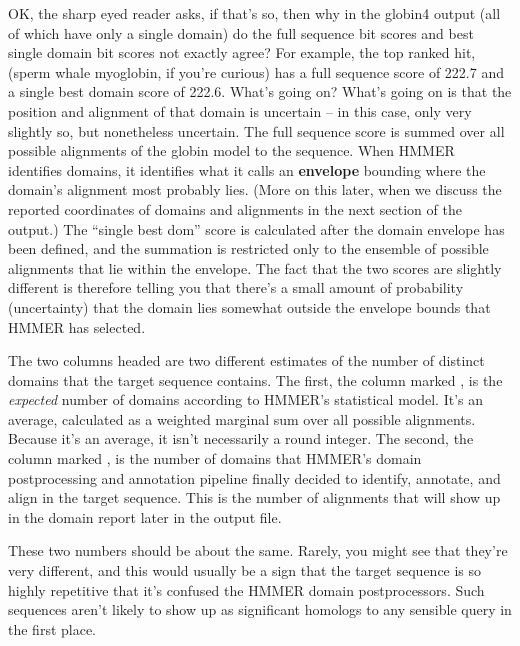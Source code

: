 OK, the sharp eyed reader asks, if that's so, then why in the globin4
output (all of which have only a single domain) do the full sequence
bit scores and best single domain bit scores not exactly agree? For
example, the top ranked hit,  (sperm whale myoglobin,
if you're curious) has a full sequence score of 222.7 and a single
best domain score of 222.6. What's going on? What's going on is that
the position and alignment of that domain is uncertain -- in this
case, only very slightly so, but nonetheless uncertain. The full
sequence score is summed over all possible alignments of the globin
model to the  sequence. When HMMER identifies
domains, it identifies what it calls an \textbf{envelope} bounding
where the domain's alignment most probably lies. (More on this later,
when we discuss the reported coordinates of domains and alignments in
the next section of the output.) The ``single best dom'' score is
calculated after the domain envelope has been defined, and the
summation is restricted only to the ensemble of possible alignments
that lie within the envelope. The fact that the two scores are
slightly different is therefore telling you that there's a small
amount of probability (uncertainty) that the domain lies somewhat
outside the envelope bounds that HMMER has selected.

The two columns headed  are two different estimates of
the number of distinct domains that the target sequence contains. The
first, the column marked , is the \emph{expected} number of
domains according to HMMER's statistical model. It's an average,
calculated as a weighted marginal sum over all possible
alignments. Because it's an average, it isn't necessarily a round
integer. The second, the column marked , is the number of
domains that HMMER's domain postprocessing and annotation pipeline
finally decided to identify, annotate, and align in the target
sequence. This is the number of alignments that will show up in the
domain report later in the output file.

These two numbers should be about the same. Rarely, you might see that
they're very different, and this would usually be a sign that the
target sequence is so highly repetitive that it's confused the HMMER
domain postprocessors. Such sequences aren't likely to show up as
significant homologs to any sensible query in the first place.


